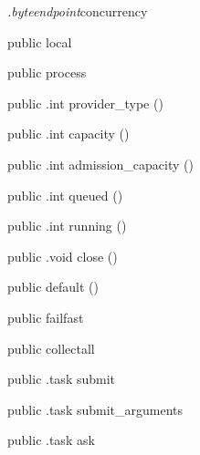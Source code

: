 \begin{CrexxClass}{\textit{.byteendpoint}}{concurrency}

  \begin{Hierarchy}
  \end{Hierarchy}

  \begin{Members}

    \Factory
      {public}
      {local}
      {}

    \Factory
      {public}
      {process}
      {}

    \Method
      {public}
      {.int}
      {provider\_type}
      {()}

    \Method
      {public}
      {.int}
      {capacity}
      {()}

    \Method
      {public}
      {.int}
      {admission\_capacity}
      {()}

    \Method
      {public}
      {.int}
      {queued}
      {()}

    \Method
      {public}
      {.int}
      {running}
      {()}

    \Method
      {public}
      {.void}
      {close}
      {()}

    \Factory
      {public}
      {default}
      {()}

    \Factory
      {public}
      {failfast}
      {}

    \Factory
      {public}
      {collectall}
      {}

    \Method
      {public}
      {.task}
      {submit}
      {}

    \Method
      {public}
      {.task}
      {submit\_arguments}
      {}

    \Method
      {public}
      {.task}
      {ask}
      {}


\end{Members}
\end{CrexxClass}
